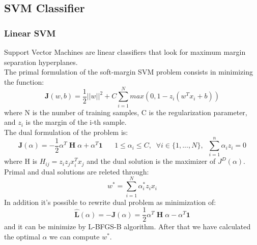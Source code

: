 \documentclass{article}
\begin{document}
\subsection{SVM Classifier}
\subsubsection{Linear SVM}
Support Vector Machines are linear classifiers that look for maximum margin separation hyperplanes.
\\The primal formulation of the soft-margin SVM problem consists in minimizing the function:
\begin{equation}
    \mathbf{J}(w,b)= \frac{1}{2}||w||^2 + C\sum_{i=1}^{N}max(0,1-z_i(w^Tx_i+b))
\end{equation}
where N is the number of training samples, C is the regularization parameter, and \(z_i\) is the margin of the i-th sample.\\
The dual formulation of the problem is:
\begin{equation}
    \mathbf{J}(\alpha)= - \frac{1}{2} \alpha^T \;\textbf{H} \;\alpha + \alpha^T \textbf{1} \;\;\;\;\;\;1\leq \alpha_i\leq C,\;\; \forall i \in \{1,...,N\},\;\; \sum_{i=1}^{n}\alpha_i z_i=0
\end{equation}
where H is \(H_{ij}=z_iz_jx_i^Tx_j\) and the dual solution is the maximizer of \(J^D(\alpha)\).\\
Primal and dual solutions are releted through:
\begin{equation}
    w^*=\sum_{i=1}^{N}\alpha_i^* z_i x_i
\end{equation}
In addition it's possible to rewrite dual problem as minimization of:
\begin{equation}
   \hat{\mathbf{L}}(\alpha)=-\mathbf{J}(\alpha)= \frac{1}{2} \alpha^T \;\textbf{H} \;\alpha - \alpha^T \textbf{1}
\end{equation}
and it can be minimize by L-BFGS-B algorithm.
After that we have calculated the optimal \(\alpha\) we can compute \(w^*\).
\end{document}
